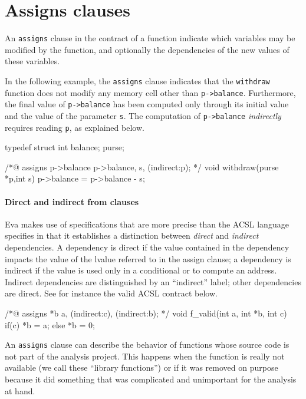 \documentclass[web]{frama-c-book}
\newcommand{\Eva}{\textsf{Eva}}
\begin{document}
\section{Assigns clauses}
\label{annot_assigns}

An \lstinline|assigns| clause in the contract of a function indicate which
variables may be modified
by the function, and optionally the dependencies of the new values
of these variables.

In the following example, the \lstinline|assigns| clause indicates that the
\lstinline|withdraw| function does not modify any memory cell other than
\lstinline|p->balance|. Furthermore, the final value of \lstinline|p->balance|
has been computed only through its initial value and the value of the
parameter \lstinline|s|. The computation of \lstinline|p->balance|
\emph{indirectly} requires reading \lstinline|p|, as explained below.
\begin{listing}{1}
typedef struct { int balance; } purse;

/*@ assigns p->balance \from p->balance, s, (indirect:p); */
void withdraw(purse *p,int s) {
  p->balance = p->balance - s;
}
\end{listing}

\paragraph{Direct and indirect from clauses}

\Eva{} makes use of specifications that are more precise than the ACSL
language specifies in that it establishes a distinction between
\emph{direct} and \emph{indirect} dependencies. A dependency is direct
if the value contained in the dependency impacts the value of the
lvalue referred to in the assign clause; a dependency is indirect if
the value is used only in a conditional or to compute an address. Indirect
dependencies are distinguished by an ``indirect'' label; other
dependencies are direct. See for instance the valid ACSL contract
below.

\begin{listing}{1}
/*@ assigns *b \from a, (indirect:c), (indirect:b); */
void f_valid(int a, int *b, int c){
  if(c) {
    *b = a;
  }
  else
    *b = 0;
}
\end{listing}


An \lstinline|assigns| clause can describe the behavior of
functions whose source code is not part of the analysis
project. This happens when the function is really not available
(we call these ``library functions'') or if it was removed on purpose
because it did something that was complicated and unimportant
for the analysis at hand.
\end{document}
